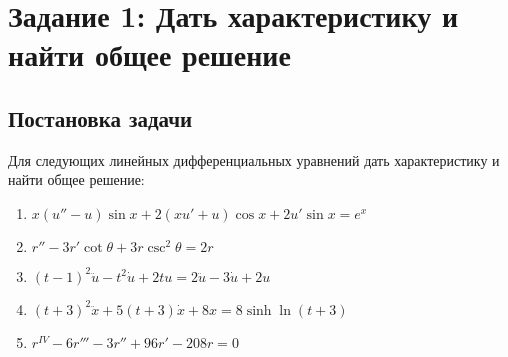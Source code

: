 \section{Задание 1: Дать характеристику и найти общее решение}
    \subsection{Постановка задачи}
        Для следующих линейных дифференциальных уравнений дать характеристику
        и найти общее решение:

        \begin{enumerate}
            \item \( x(u'' - u) \sin{x} + 2(xu' + u)\cos{x} + 2u'\sin{x} = e^x \)
            
            \item \( r'' - 3r' \cot{\theta} + 3r\csc^2{\theta} = 2r \)
            
            \item \( (t - 1)^2 \ddot{u} - t^2\dot{u} + 2tu = 2\ddot{u} - 3\dot{u} + 2u \)
            
            \item \( (t + 3)^2 \ddot{x} + 5(t + 3)\dot{x} + 8x = 8\sinh{\ln(t + 3)} \)
            
            \item \( r^{\textit{IV}} - 6r''' - 3r'' + 96r' - 208r = 0 \)
        \end{enumerate}

